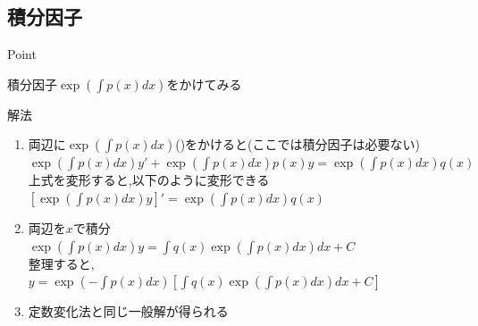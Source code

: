 \documentclass[a4paper]{jsarticle}
\begin{document}
\subsection{積分因子}
\begin{itembox}[l]{Point}
    \begin{center}
        積分因子$\exp{\left(\int p\left(x\right)dx\right)}$をかけてみる
    \end{center}
\end{itembox}
\begin{itembox}[l]{解法}
    \begin{enumerate}[(1)]
        \item 両辺に$\exp{\left(\int p\left(x\right)dx\right)}$()をかけると(ここでは積分因子は必要ない)\\
              $\exp{\left(\int p\left(x\right)dx\right)}y'+\exp{\left(\int p\left(x\right)dx\right)}p\left(x\right)y=\exp{\left(\int p\left(x\right)dx\right)}q\left(x\right)$\\
              上式を変形すると,以下のように変形できる\\
              $\left[\exp{\left(\int p\left(x\right)dx\right)}y\right]'=\exp{\left(\int p\left(x\right)dx\right)}q\left(x\right)$
        \item 両辺を$x$で積分\\
              $\exp{\left(\int p\left(x\right)dx\right)}y=\int q\left(x\right)\exp{\left(\int p\left(x\right)dx\right)}dx+C$\\
              整理すると,\\
              $y=\exp{\left(-\int p\left(x\right)dx\right)}\left[\int q\left(x\right)\exp{\left(\int p\left(x\right)dx\right)}dx+C\right]$
        \item 定数変化法と同じ一般解が得られる
    \end{enumerate}
\end{itembox}
\end{document}
